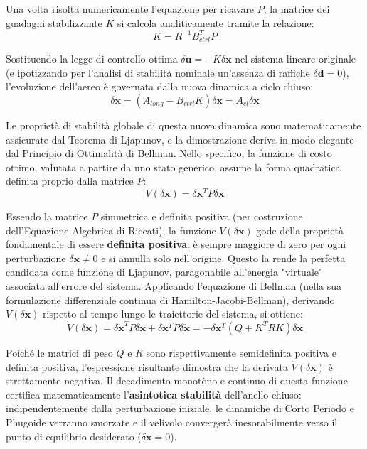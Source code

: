 Una volta risolta numericamente l'equazione per ricavare $P$, la matrice dei guadagni stabilizzante $K$ si calcola analiticamente tramite la relazione:
\begin{equation}
    K = R^{-1} B_{ctrl}^T P
\end{equation}

Sostituendo la legge di controllo ottima $\delta\mathbf{u} = -K\delta\mathbf{x}$ nel sistema lineare originale (e ipotizzando per l'analisi di stabilità nominale un'assenza di raffiche $\delta\mathbf{d} = 0$), l'evoluzione dell'aereo è governata dalla nuova dinamica a ciclo chiuso:
\begin{equation}
    \delta\dot{\mathbf{x}} = (A_{long} - B_{ctrl}K)\delta\mathbf{x} = A_{cl}\delta\mathbf{x}
\end{equation}

Le proprietà di stabilità globale di questa nuova dinamica sono matematicamente assicurate dal Teorema di Ljapunov, e la dimostrazione deriva in modo elegante dal Principio di Ottimalità di Bellman. Nello specifico, la funzione di costo ottimo, valutata a partire da uno stato generico, assume la forma quadratica definita proprio dalla matrice $P$:
\begin{equation}
    V(\delta\mathbf{x}) = \delta\mathbf{x}^T P \delta\mathbf{x}
\end{equation}

Essendo la matrice $P$ simmetrica e definita positiva (per costruzione dell'Equazione Algebrica di Riccati), la funzione $V(\delta\mathbf{x})$ gode della proprietà fondamentale di essere \textbf{definita positiva}: è sempre maggiore di zero per ogni perturbazione $\delta\mathbf{x} \neq 0$ e si annulla solo nell'origine. Questo la rende la perfetta candidata come funzione di Ljapunov, paragonabile all'energia "virtuale" associata all'errore del sistema. Applicando l'equazione di Bellman (nella sua formulazione differenziale continua di Hamilton-Jacobi-Bellman), derivando $V(\delta\mathbf{x})$ rispetto al tempo lungo le traiettorie del sistema, si ottiene:
\begin{equation}
    \dot{V}(\delta\mathbf{x}) = \delta\dot{\mathbf{x}}^T P \delta\mathbf{x} + \delta\mathbf{x}^T P \delta\dot{\mathbf{x}} = -\delta\mathbf{x}^T (Q + K^T R K) \delta\mathbf{x}
\end{equation}

Poiché le matrici di peso $Q$ e $R$ sono rispettivamente semidefinita positiva e definita positiva, l'espressione risultante dimostra che la derivata $\dot{V}(\delta\mathbf{x})$ è strettamente negativa. Il decadimento monotòno e continuo di questa funzione certifica matematicamente l'\textbf{asintotica stabilità} dell'anello chiuso: indipendentemente dalla perturbazione iniziale, le dinamiche di Corto Periodo e Phugoide verranno smorzate e il velivolo convergerà inesorabilmente verso il punto di equilibrio desiderato ($\delta\mathbf{x} = 0$).

